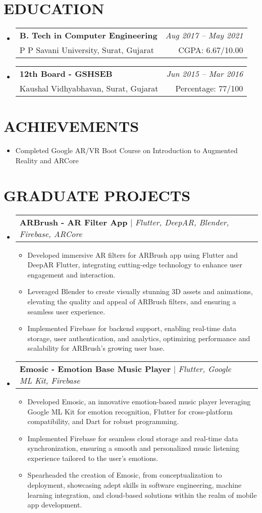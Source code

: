 \documentclass[letterpaper,11pt]{article}
\makeatletter
\newcommand{\resumeItem}[1]{
  \item\small{
    {#1 \vspace{-2pt}}
  }
}
\newcommand{\resumeSubheading}[4]{
  \vspace{-2pt}\item
    \begin{tabular*}{1.0\textwidth}[t]{l@{\extracolsep{\fill}}r}
      \textbf{#1} & \textit{\small #2} \\
      \textnormal {\small#3} & \textnormal {\small #4} \\
    \end{tabular*}\vspace{-7pt}
}
\newcommand{\resumeProjectHeading}[2]{
    \item
    \begin{tabular*}{1.001\textwidth}{l@{\extracolsep{\fill}}r}
      \small#1 & \textit{\small #2}\\
    \end{tabular*}\vspace{-7pt}
}
\newcommand{\resumeSubHeadingListStart}{\begin{itemize}[leftmargin=0.0in, label={}]}
\newcommand{\resumeSubHeadingListEnd}{\end{itemize}}
\newcommand{\resumeItemListStart}{\begin{itemize}}
\newcommand{\resumeItemListEnd}{\end{itemize}\vspace{-5pt}}
\makeatother
\begin{document}
\section{EDUCATION}
  \resumeSubHeadingListStart
    \resumeSubheading
      {B. Tech in Computer Engineering}{Aug 2017 -- May 2021}
      {P P Savani University, Surat, Gujarat}{CGPA: 6.67/10.00}
    \resumeSubheading
      {12th Board - GSHSEB}{Jun 2015 -- Mar 2016}
      {Kaushal Vidhyabhavan, Surat, Gujarat}{Percentage: 77/100}
  \resumeSubHeadingListEnd    


\section{ACHIEVEMENTS}

\resumeItemListStart
    \resumeItem {Completed Google AR/VR Boot Course on Introduction to Augmented Reality and ARCore}
\resumeItemListEnd

\section{GRADUATE PROJECTS}
    \resumeSubHeadingListStart
    \resumeProjectHeading
         {\textbf{ARBrush - AR Filter App} $|$ \emph{ Flutter, DeepAR, Blender, Firebase, ARCore }}
         {}
          \resumeItemListStart
            \resumeItem{
Developed immersive AR filters for ARBrush app using Flutter and DeepAR Flutter, integrating cutting-edge technology to enhance user engagement and interaction.
}
            \resumeItem{
Leveraged Blender to create visually stunning 3D assets and animations, elevating the quality and appeal of ARBrush filters, and ensuring a seamless user experience.
}
            \resumeItem{
Implemented Firebase for backend support, enabling real-time data storage, user authentication, and analytics, optimizing performance and scalability for ARBrush's growing user base.
}
          \resumeItemListEnd
          \vspace{-15pt}
      \resumeProjectHeading
          {\textbf{Emosic - Emotion Base Music Player} $|$ \emph{ Flutter, Google ML Kit, Firebase }}
         {}
          \resumeItemListStart
            \resumeItem{
Developed Emosic, an innovative emotion-based music player leveraging Google ML Kit for emotion recognition, Flutter for cross-platform compatibility, and Dart for robust programming.}
            \resumeItem{
Implemented Firebase for seamless cloud storage and real-time data synchronization, ensuring a smooth and personalized music listening experience tailored to the user's emotions.}
            \resumeItem{
Spearheaded the creation of Emosic, from conceptualization to deployment, showcasing adept skills in software engineering, machine learning integration, and cloud-based solutions within the realm of mobile app development.}
          \resumeItemListEnd    
    \resumeSubHeadingListEnd
\end{document}

